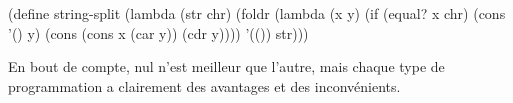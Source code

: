 \documentclass[french]{article}
\begin{document}
				(define string-split
					(lambda (str chr)
						(foldr  
							(lambda (x y)
								(if (equal? x chr) 
									(cons '() y)
									(cons (cons x (car y)) (cdr y))))
							'(()) str)))
				
				En bout de compte, nul n'est meilleur que l'autre, mais chaque type de programmation a clairement des avantages et des inconvénients.
		
		
	
\end{document}
